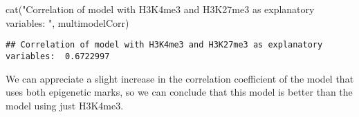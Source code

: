 \documentclass[
]{article}
\newenvironment{Shaded}{\begin{snugshade}}{\end{snugshade}}
\newcommand{\FunctionTok}[1]{\textcolor[rgb]{0.00,0.00,0.00}{#1}}
\newcommand{\NormalTok}[1]{#1}
\newcommand{\StringTok}[1]{\textcolor[rgb]{0.31,0.60,0.02}{#1}}
\begin{document}
\begin{Shaded}
\begin{Highlighting}[]
\FunctionTok{cat}\NormalTok{(}\StringTok{"Correlation of model with H3K4me3 and H3K27me3 as explanatory variables: "}\NormalTok{, multimodelCorr)}
\end{Highlighting}
\end{Shaded}

\begin{verbatim}
## Correlation of model with H3K4me3 and H3K27me3 as explanatory variables:  0.6722997
\end{verbatim}

We can appreciate a slight increase in the correlation coefficient of
the model that uses both epigenetic marks, so we can conclude that this
model is better than the model using just H3K4me3.
\end{document}

